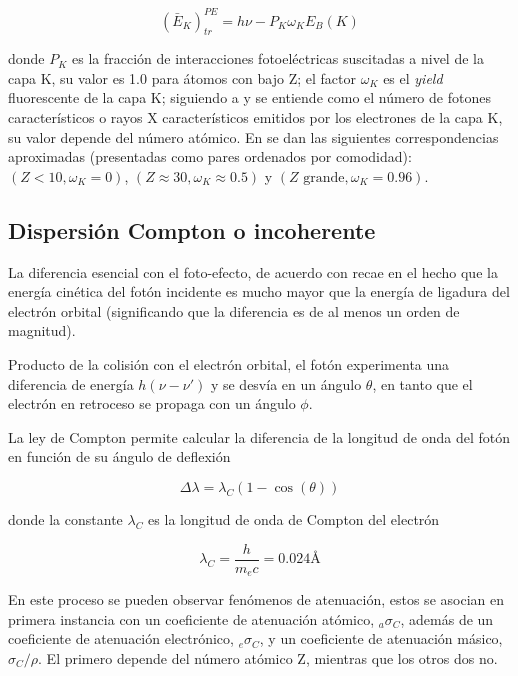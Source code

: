 \documentclass[12pt,letterpaper, oneside]{book}
\begin{document}
	 \begin{equation}
	 	(\bar{E}_K)^{PE}_{tr} = h\nu - P_K \omega_K E_B(K)\label{energia_cinetica_fotoelectrones}
	 \end{equation}
	 
	 \noindent donde $P_K$ es la fracción de interacciones fotoeléctricas suscitadas a nivel de la capa K, su valor es 1.0 para átomos con bajo Z; el factor $\omega_K$ es el \textit{yield} fluorescente de la capa K; siguiendo a \cite{IAEA.2005} y \cite{Mayles.2007} se entiende como el número de fotones característicos o rayos X característicos emitidos por los electrones de la capa K, su valor depende del número atómico. En \cite{IAEA.2005} se dan las siguientes correspondencias aproximadas (presentadas como pares ordenados por comodidad): $(Z<10,\omega_K=0)$, $(Z\approx 30,\omega_K \approx 0.5)$ y $(Z\textrm{ grande},\omega_K=0.96)$. 
	 
	 \subsection{Dispersión Compton o incoherente}
	 La diferencia esencial con el foto-efecto, de acuerdo con \cite{IAEA.2005} recae en el hecho que la energía cinética del fotón incidente es mucho mayor que la energía de ligadura del electrón orbital (significando que la diferencia es de al menos un orden de magnitud). 
	 
	 Producto de la colisión con el electrón orbital, el fotón experimenta una diferencia de energía $h(\nu - \nu')$ y se desvía en un ángulo $\theta$, en tanto que el electrón en retroceso se propaga con un ángulo $\phi$. 
	 
	 La ley de Compton permite calcular la diferencia de la longitud de onda del fotón en función de su ángulo de deflexión
	 
	 \begin{equation}
	 	\Delta \lambda = \lambda_C (1 - \cos(\theta)) \label{ley_compton}
	 \end{equation}
	 
	 \noindent donde la constante $\lambda_C$ es la longitud de onda de Compton del electrón
	 
	 $$\lambda_C=\frac{h}{m_e c}=0.024 \textrm{\AA}$$
	 
	 En este proceso se pueden observar fenómenos de atenuación, estos se asocian en primera instancia con un coeficiente de atenuación atómico, $_a\sigma_C$, además de un coeficiente de atenuación electrónico, $_e\sigma_C$, y un coeficiente de atenuación másico, $\sigma_C/\rho$. El primero depende del número atómico Z, mientras que los otros dos no\cite{IAEA.2005}.
	 
\end{document}
